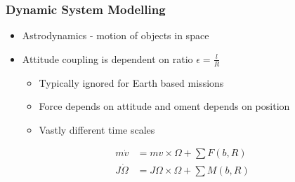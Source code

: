 \begin{frame}
\frametitle{Dynamic System Modelling}
\begin{itemize}
    \item Astrodynamics - motion of objects in space
    \pause
    \item Attitude coupling is dependent on ratio \( \epsilon = \frac{l}{R} \)
        \begin{itemize}
            \item Typically ignored for Earth based missions 
            \item Force depends on attitude and oment depends on position
            \item Vastly different time scales
        \end{itemize}
\end{itemize}
\begin{align*}
    m \dot{v} &= m v \times \Omega + \sum F(b, R) \\
    J \dot{\Omega}  &= J \Omega \times \Omega +  \sum M(b, R) 
\end{align*}


\end{frame}
